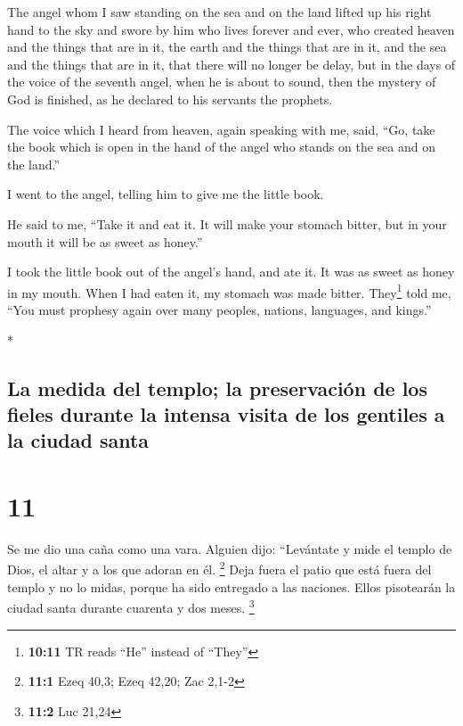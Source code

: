 \begin{paracol}{2}
\begin{otherlanguage}{english}
 The angel whom I saw standing on the sea and on the land
lifted up his right hand to the sky  and swore by him who
lives forever and ever, who created heaven and the things that are in
it, the earth and the things that are in it, and the sea and the things
that are in it, that there will no longer be delay,  but
in the days of the voice of the seventh angel, when he is about to
sound, then the mystery of God is finished, as he declared to his
servants the prophets.

 The voice which I heard from heaven, again speaking with
me, said, ``Go, take the book which is open in the hand of the angel who
stands on the sea and on the land.''

 I went to the angel, telling him to give me the little
book.

He said to me, ``Take it and eat it. It will make your stomach bitter,
but in your mouth it will be as sweet as honey.''

 I took the little book out of the angel's hand, and ate
it. It was as sweet as honey in my mouth. When I had eaten it, my
stomach was made bitter.  They\footnote{\textbf{10:11} TR
  reads ``He'' instead of ``They''} told me, ``You must prophesy again
over many peoples, nations, languages, and kings.''

\end{otherlanguage}

\switchcolumn[0]*

\hypertarget{la-medida-del-templo-la-preservaciuxf3n-de-los-fieles-durante-la-intensa-visita-de-los-gentiles-a-la-ciudad-santa}{%
\subsection{La medida del templo; la preservación de los fieles durante
la intensa visita de los gentiles a la ciudad
santa}\label{la-medida-del-templo-la-preservaciuxf3n-de-los-fieles-durante-la-intensa-visita-de-los-gentiles-a-la-ciudad-santa}}

\hypertarget{section-20}{%
\section{11}\label{section-20}}

 Se me dio una caña como una vara. Alguien dijo:
``Levántate y mide el templo de Dios, el altar y a los que adoran en él.
\footnote{\textbf{11:1} Ezeq 40,3; Ezeq 42,20; Zac 2,1-2} 
Deja fuera el patio que está fuera del templo y no lo midas, porque ha
sido entregado a las naciones. Ellos pisotearán la ciudad santa durante
cuarenta y dos meses. \footnote{\textbf{11:2} Luc 21,24}


\end{paracol}
